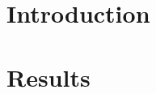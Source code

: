 \documentclass{article}
\begin{document}
\section{Introduction}

\section{Results}



\end{document}
